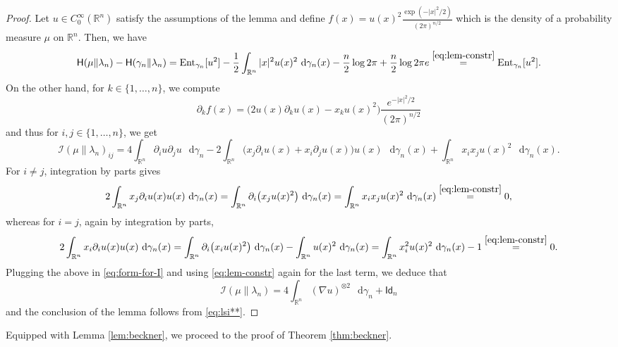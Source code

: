 \documentclass[a4paper,twoside,11pt,reqno]{amsart}
\newcommand*\diff{\mathop{}\!\mathrm{d}}
\newcommand{\R}{\mathbb{R}} %
\newcommand{\msf}{\mathsf}
\newcommand{\mr}{\mathrm}
\newcommand{\III}{\mathscr{I}}
\newcommand{\HH}{\mathsf{H}}
\begin{document}
\begin{proof}
Let $u\in C_0^\infty(\R^n)$ satisfy the assumptions of the lemma and define $f(x) = u(x)^2 \tfrac{\exp(-|x|^2/2)}{(2\pi)^{n/2}}$ which is the density of a probability measure $\mu$ on $\R^n$. Then, we have
\begin{equation}
\HH(\mu\|\lambda_n)-\HH(\gamma_n\|\lambda_n) = \mr{Ent}_{\gamma_n}[u^2] - \frac{1}{2} \int_{\R^n} |x|^2 u(x)^2 \,\diff\gamma_n(x) - \frac{n}{2}\log2\pi + \frac{n}{2}\log2\pi e \stackrel{\eqref{eq:lem-constr}}{=} \mr{Ent}_{\gamma_n}[u^2].
\end{equation}
On the other hand, for $k\in\{1,\ldots,n\}$, we compute
\begin{equation}
\partial_kf(x) =\big( 2u(x)\partial_ku(x) - x_k u(x)^2\big) \frac{e^{-|x|^2/2}}{(2\pi)^{n/2}}
\end{equation}
and thus for $i,j\in\{1,\ldots,n\}$, we get
\begin{equation} \label{eq:form-for-I}
\III(\mu\|\lambda_n)_{ij} = 4 \int_{\R^n} \partial_iu \partial_j u\,\diff\gamma_n - 2\int_{\R^n} \big( x_j \partial_iu(x)+x_i\partial_ju(x)\big) u(x)\,\diff\gamma_n(x) + \int_{\R^n} x_ix_j u(x)^2\,\diff\gamma_n(x).
\end{equation}
For $i\neq j$, integration by parts gives
\begin{equation}
2\int_{\R^n}  x_j \partial_iu(x) u(x)\,\diff\gamma_n(x) = \int_{\R^n} \partial_i \big( x_j u(x)^2\big)\,\diff\gamma_n(x) = \int_{\R^n} x_ix_j u(x)^2\,\diff\gamma_n(x) \stackrel{\eqref{eq:lem-constr}}{=} 0,
\end{equation}
whereas for $i=j$, again by integration by parts,
\begin{equation*}
2\int_{\R^n}  x_i \partial_iu(x) u(x)\,\diff\gamma_n(x) = \int_{\R^n} \partial_i \big( x_i u(x)^2\big)\,\diff\gamma_n(x) - \int_{\R^n} u(x)^2\,\diff\gamma_n(x) = \int_{\R^n} x_i^2 u(x)^2\,\diff\gamma_n(x) - 1 \stackrel{\eqref{eq:lem-constr}}{=} 0.
\end{equation*}
Plugging the above in \eqref{eq:form-for-I} and using \eqref{eq:lem-constr} again for the last term, we deduce that
\begin{equation}
\III(\mu\|\lambda_n) = 4 \int_{\R^n} (\nabla u)^{\otimes 2} \,\diff\gamma_n + \msf{Id}_n
\end{equation}
and the conclusion of the lemma follows from \eqref{eq:lsi**}.
\end{proof}

Equipped with Lemma \ref{lem:beckner}, we proceed to the proof of Theorem \ref{thm:beckner}.
\end{document}
